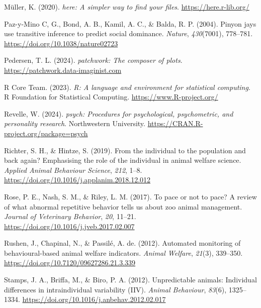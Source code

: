 \documentclass[
  pub]{apa6}
\newlength{\cslhangindent}
\newlength{\cslentryspacingunit} %
\newenvironment{CSLReferences}[2] %
 {%
  \setlength{\parindent}{0pt}
  \ifodd #1
  \let\oldpar\par
  \def\par{\hangindent=\cslhangindent\oldpar}
  \fi
  \setlength{\parskip}{#2\cslentryspacingunit}
 }%
 {}
\begin{document}
\begin{CSLReferences}{1}{0}
\leavevmode{}%
Müller, K. (2020). \emph{{here}: A simpler way to find your files}. \url{https://here.r-lib.org/}

\leavevmode{}%
Paz-y-Mino C, G., Bond, A. B., Kamil, A. C., \& Balda, R. P. (2004). Pinyon jays use transitive inference to predict social dominance. \emph{Nature}, \emph{430}(7001), 778--781. \url{https://doi.org/10.1038/nature02723}

\leavevmode{}%
Pedersen, T. L. (2024). \emph{{patchwork}: The composer of plots}. \url{https://patchwork.data-imaginist.com}

\leavevmode{}%
R Core Team. (2023). \emph{R: A language and environment for statistical computing}. R Foundation for Statistical Computing. \url{https://www.R-project.org/}

\leavevmode{}%
Revelle, W. (2024). \emph{{psych}: Procedures for psychological, psychometric, and personality research}. Northwestern University. \url{https://CRAN.R-project.org/package=psych}

\leavevmode{}%
Richter, S. H., \& Hintze, S. (2019). From the individual to the population {\textendash} and back again? {Emphasising} the role of the individual in animal welfare science. \emph{Applied Animal Behaviour Science}, \emph{212}, 1--8. \url{https://doi.org/10.1016/j.applanim.2018.12.012}

\leavevmode{}%
Rose, P. E., Nash, S. M., \& Riley, L. M. (2017). To pace or not to pace? {A} review of what abnormal repetitive behavior tells us about zoo animal management. \emph{Journal of Veterinary Behavior}, \emph{20}, 11--21. \url{https://doi.org/10.1016/j.jveb.2017.02.007}

\leavevmode{}%
Rushen, J., Chapinal, N., \& Passilé, A. de. (2012). Automated monitoring of behavioural-based animal welfare indicators. \emph{Animal Welfare}, \emph{21}(3), 339--350. \url{https://doi.org/10.7120/09627286.21.3.339}

\leavevmode{}%
Stamps, J. A., Briffa, M., \& Biro, P. A. (2012). Unpredictable animals: Individual differences in intraindividual variability ({IIV}). \emph{Animal Behaviour}, \emph{83}(6), 1325--1334. \url{https://doi.org/10.1016/j.anbehav.2012.02.017}


\end{CSLReferences}
\end{document}
